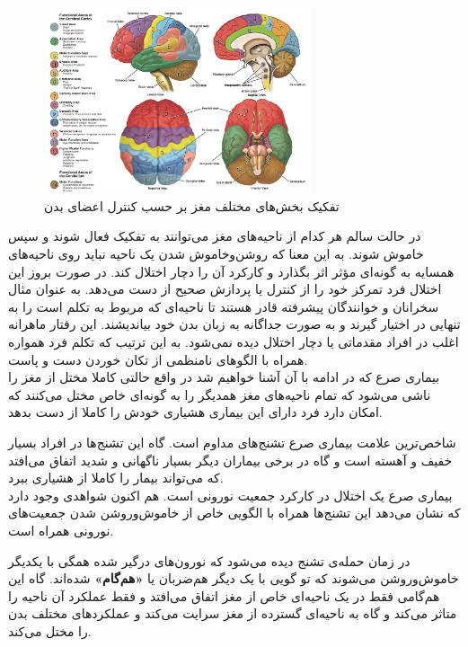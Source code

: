 \begin{figure}
	\centering
	\includegraphics[width=0.7\textwidth]{../Figures/neuroanatomy_plot.jpg}
	\caption{
		تفکیک بخش‌های مختلف مغز بر حسب کنترل اعضای بدن
		\cite{penttila_2022}
	}
	\label{fig:brain_anatomy}
\end{figure}

 در حالت سالم هر کدام از ناحیه‌های مغز می‌توانند به تفکیک فعال شوند و سپس خاموش شوند. به این معنا که روشن‌وخاموش شدن یک ناحیه نباید روی ناحیه‌های همسایه به گونه‌ای مؤثر اثر بگذارد و کارکرد آن را دچار اختلال کند. در صورت بروز این اختلال فرد تمرکز خود را از کنترل یا پردازش صحیح از دست می‌دهد. به عنوان مثال سخرانان و خوانندگان پیشرفته قادر هستند تا ناحیه‌ای که مربوط به تکلم است را به تنهایی در اختیار گیرند و به صورت جداگانه به زبان بدن خود بیاندیشند. این رفتار ماهرانه اغلب در افراد مقدماتی یا دچار اختلال دیده نمی‌شود. به این ترتیب که تکلم فرد همواره همراه با الگوهای نامنظمی از تکان خوردن دست و پاست.\\
 
 بیماری صرع که در ادامه با آن آشنا خواهیم شد در واقع حالتی کاملا مختل از مغز را ناشی می‌شود که تمام ناحیه‌های مغز همدیگر را به گونه‌ای خاص مختل می‌کنند که امکان دارد فرد دارای این بیماری هشیاری خودش را کاملا از دست بدهد.

شاخص‌ترین علامت بیماری صرع تشنج‌های مداوم است. گاه این تشنج‌ها در افراد بسیار خفیف و آهسته است و گاه در برخی بیماران دیگر بسیار ناگهانی و شدید اتفاق می‌افتد که می‌تواند بیمار را کاملا از هشیاری ببرد.\\

بیماری صرع یک اختلال در کارکرد جمعیت نورونی است. هم اکنون شواهدی وجود دارد که نشان می‌دهد این تشنج‌ها همراه با الگویی خاص از خاموش‌وروشن شدن جمعیت‌های نورونی همراه است. 

در زمان حمله‌ی تشنج دیده می‌شود که نورون‌های درگیر شده همگی با یکدیگر خاموش‌وروشن می‌شوند که تو گویی با یک دیگر هم‌ضربان یا \textbf{«هم‌گام»} شده‌اند. گاه این هم‌گامی فقط در یک ناحیه‌ای خاص از مغز اتفاق می‌افتد و فقط عملکرد آن ناحیه را متاثر می‌کند و گاه به ناحیه‌ای گسترده از مغز سرایت می‌کند و عملکردهای مختلف بدن را مختل می‌کند.\\

